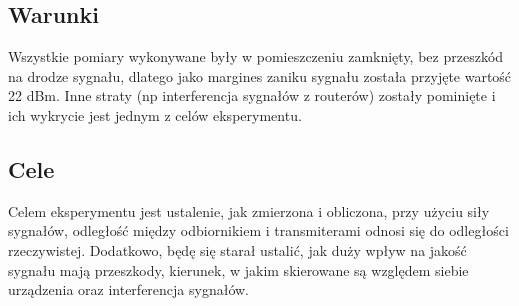 \subsection{Warunki}
Wszystkie pomiary wykonywane były w pomieszczeniu zamknięty, bez przeszkód na drodze sygnału, dlatego jako margines zaniku sygnału została przyjęte wartość 22 dBm. Inne straty (np interferencja sygnałów z routerów) zostały pominięte i ich wykrycie jest jednym z celów eksperymentu.
\subsection{Cele}
Celem eksperymentu jest ustalenie, jak zmierzona i obliczona, przy użyciu siły sygnałów, odległość między odbiornikiem i transmiterami odnosi się do odległości rzeczywistej. Dodatkowo, będę się starał ustalić, jak duży wpływ na jakość sygnału mają przeszkody, kierunek, w jakim skierowane są względem siebie urządzenia oraz interferencja sygnałów.
